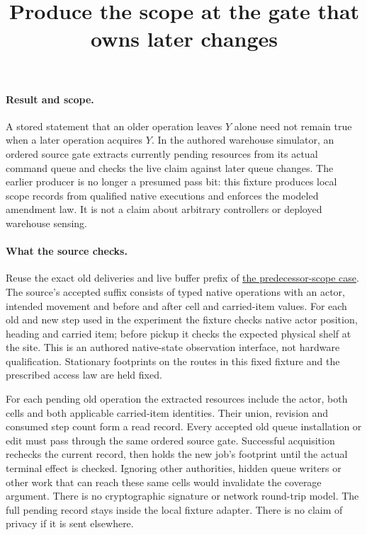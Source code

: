 \documentclass[11pt]{article}
\title{Produce the scope at the gate that owns later changes}
\date{}
\begin{document}
\maketitle

\paragraph{Result and scope.}
A stored statement that an older operation leaves $Y$ alone need not
remain true when a later operation acquires $Y$. In the authored warehouse
simulator, an ordered source gate extracts currently pending resources
from its actual command queue and checks the live claim against later queue
changes. The earlier producer is no longer a presumed pass bit: this
fixture produces local scope records from qualified native executions
and enforces the modeled amendment law. It is not a claim about arbitrary
controllers or deployed warehouse sensing.

\paragraph{What the source checks.}
Reuse the exact old deliveries and live buffer prefix of
\href{https://github.com/eternal-november/eos-research-programmes/pull/586}
{the predecessor-scope case}. The source's accepted suffix consists of
typed native operations with an actor, intended movement and before and
after cell and carried-item values. For each old and new step used in
the experiment the fixture checks native actor position, heading and
carried item; before pickup it checks the expected physical shelf at
the site. This is an authored native-state observation interface, not
hardware qualification. Stationary footprints on the routes in this
fixed fixture and the prescribed access law are held fixed.

For each pending old operation the extracted resources include the
actor, both cells and both applicable carried-item identities. Their
union, revision and consumed step count form a read record. Every
accepted old queue installation or edit must pass through the same
ordered source gate. Successful acquisition rechecks the current
record, then holds the new job's footprint until the actual terminal
effect is checked. Ignoring other authorities, hidden queue writers
or other work that can reach these same cells would invalidate the
coverage argument. There is no cryptographic signature or network
round-trip model. The full pending record stays inside the local
fixture adapter. There is no claim of privacy if it is sent elsewhere.
\end{document}
